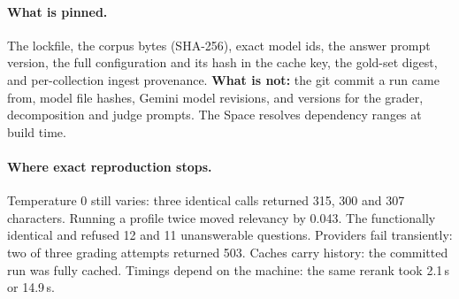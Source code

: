 \paragraph{What is pinned.} The lockfile, the corpus bytes (SHA-256), exact model ids, the answer prompt version, the full configuration and its hash in the cache key, the gold-set digest, and per-collection ingest provenance. \textbf{What is not:} the git commit a run came from, model file hashes, Gemini model revisions, and versions for the grader, decomposition and judge prompts. The Space resolves dependency ranges at build time.

\paragraph{Where exact reproduction stops.} Temperature 0 still varies: three identical calls returned 315, 300 and 307 characters. Running a profile twice moved relevancy by 0.043. The functionally identical  and  refused 12 and 11 unanswerable questions. Providers fail transiently: two of three grading attempts returned 503. Caches carry history: the committed  run was fully cached. Timings depend on the machine: the same rerank took 2.1\,s or 14.9\,s.
